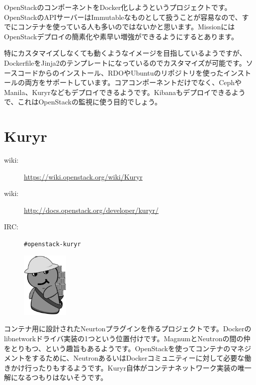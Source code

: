 OpenStackのコンポーネントをDocker化しようというプロジェクトです。OpenStackのAPIサーバーはImmutableなものとして扱うことが容易なので、すでにコンテナを使っている人も多いのではないかと思います。MissionにはOpenStackデプロイの簡素化や素早い増強ができるようにするとあります。

特にカスタマイズしなくても動くようなイメージを目指しているようですが、DockerfileをJinja2のテンプレートになっているのでカスタマイズが可能です。ソースコードからのインストール、RDOやUbuntuのリポジトリを使ったインストールの両方をサポートしています。コアコンポーネントだけでなく、CephやManila、Kuryrなどもデプロイできるようです。Kibanaもデプロイできるようで、これはOpenStackの監視に使う目的でしょう。

\section{Kuryr}

\begin{description}
	\item[wiki:] \url{https://wiki.openstack.org/wiki/Kuryr}
	\item[wiki:] \url{http://docs.openstack.org/developer/kuryr/}
	\item[IRC:] \verb|#openstack-kuryr|
\end{description}

\begin{figure}
	\vspace*{-2\intextsep}
	\begin{center}
		\includegraphics[width=0.2\textwidth]{img/kuryr_logo.png}
	\end{center}
\end{figure}

コンテナ用に設計されたNeurtonプラグインを作るプロジェクトです。Dockerのlibnetworkドライバ実装の1つという位置付けです。MagnumとNeutronの間の仲をとりもつ、という趣旨もあるようです。OpenStackを使ってコンテナのマネジメントをするために、NeutronあるいはDockerコミュニティーに対して必要な働きかけ行ったりもするようです。Kuryr自体がコンテナネットワーク実装の唯一解になるつもりはないそうです。

